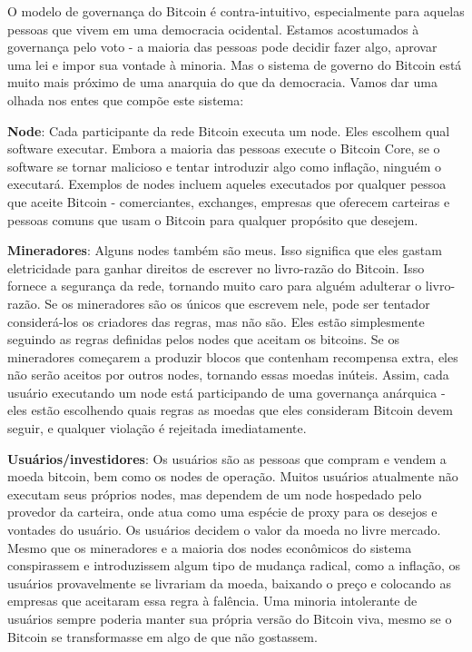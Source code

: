 O modelo de governança do Bitcoin é contra-intuitivo, especialmente para aquelas pessoas que vivem em uma democracia ocidental. Estamos acostumados à governança pelo voto - a maioria das pessoas pode decidir fazer algo, aprovar uma lei e impor sua vontade à minoria. Mas o sistema de governo do Bitcoin está muito mais próximo de uma anarquia do que da democracia. Vamos dar uma olhada nos entes que compõe este sistema:

\textbf{Node}: Cada participante da rede Bitcoin executa um node. Eles escolhem qual software executar. Embora a maioria das pessoas execute o Bitcoin Core, se o software se tornar malicioso e tentar introduzir algo como inflação, ninguém o executará. Exemplos de nodes incluem aqueles executados por qualquer pessoa que aceite Bitcoin - comerciantes, exchanges, empresas que oferecem carteiras e pessoas comuns que usam o Bitcoin para qualquer propósito que desejem.

\textbf{Mineradores}: Alguns nodes também são meus. Isso significa que eles gastam eletricidade para ganhar direitos de escrever no livro-razão do Bitcoin. Isso fornece a segurança da rede, tornando muito caro para alguém adulterar o livro-razão. Se os mineradores são os únicos que escrevem nele, pode ser tentador considerá-los os criadores das regras, mas não são. Eles estão simplesmente seguindo as regras definidas pelos nodes que aceitam os bitcoins. Se os mineradores começarem a produzir blocos que contenham recompensa extra, eles não serão aceitos por outros nodes, tornando essas moedas inúteis. Assim, cada usuário executando um node está participando de uma governança anárquica - eles estão escolhendo quais regras as moedas que eles consideram Bitcoin devem seguir, e qualquer violação é rejeitada imediatamente.

\textbf{Usuários/investidores}: Os usuários são as pessoas que compram e vendem a moeda bitcoin, bem como os nodes de operação. Muitos usuários atualmente não executam seus próprios nodes, mas dependem de um node hospedado pelo provedor da carteira, onde atua como uma espécie de proxy para os desejos e vontades do usuário. Os usuários decidem o valor da moeda no livre mercado. Mesmo que os mineradores e a maioria dos nodes econômicos do sistema conspirassem e introduzissem algum tipo de mudança radical, como a inflação, os usuários provavelmente se livrariam da moeda, baixando o preço e colocando as empresas que aceitaram essa regra à falência. Uma minoria intolerante de usuários sempre poderia manter sua própria versão do Bitcoin viva, mesmo se o Bitcoin se transformasse em algo de que não gostassem.

